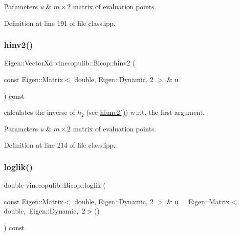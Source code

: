 \begin{DoxyParams}{Parameters}
{\em u} & $m \times 2$ matrix of evaluation points. \\
\hline
\end{DoxyParams}


Definition at line 191 of file class.\+ipp.

\mbox{\label{classvinecopulib_1_1_bicop_a571c4e213695f805f8e0e7843f9b245b}} 
\subsubsection{\texorpdfstring{hinv2()}{hinv2()}}
{\footnotesize\ttfamily Eigen\+::\+Vector\+Xd vinecopulib\+::\+Bicop\+::hinv2 (\begin{DoxyParamCaption}\item[{const Eigen\+::\+Matrix$<$ double, Eigen\+::\+Dynamic, 2 $>$ \&}]{u }\end{DoxyParamCaption}) const\hspace{0.3cm}{\ttfamily [inline]}}



calculates the inverse of $ h_2 $ (see \hyperlink{classvinecopulib_1_1_bicop_a9bbf2e9ab9a04a45e8d98206a46b7596}{hfunc2()}) w.\+r.\+t. the first argument. 


\begin{DoxyParams}{Parameters}
{\em u} & $m \times 2$ matrix of evaluation points. \\
\hline
\end{DoxyParams}


Definition at line 214 of file class.\+ipp.

\mbox{\label{classvinecopulib_1_1_bicop_a81979ae3578ec9af1f5f956751faa63d}} 
\subsubsection{\texorpdfstring{loglik()}{loglik()}}
{\footnotesize\ttfamily double vinecopulib\+::\+Bicop\+::loglik (\begin{DoxyParamCaption}\item[{const Eigen\+::\+Matrix$<$ double, Eigen\+::\+Dynamic, 2 $>$ \&}]{u = {\ttfamily Eigen\+:\+:Matrix$<$double,~Eigen\+:\+:Dynamic,~2$>$()} }\end{DoxyParamCaption}) const\hspace{0.3cm}{\ttfamily [inline]}}



